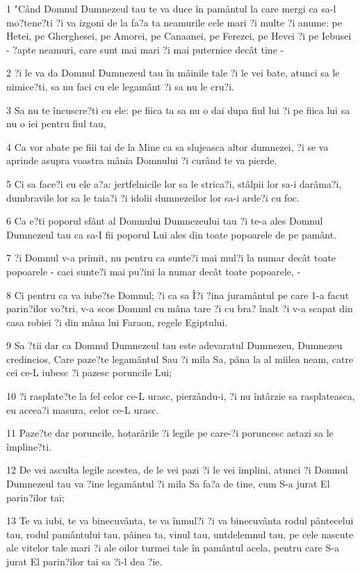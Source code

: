 \par 1 "Când Domnul Dumnezeul tau te va duce în pamântul la care mergi ca sa-l mo?tene?ti ?i va izgoni de la fa?a ta neamurile cele mari ?i multe ?i anume: pe Hetei, pe Gherghesei, pe Amorei, pe Canaanei, pe Ferezei, pe Hevei ?i pe Iebusei - ?apte neamuri, care sunt mai mari ?i mai puternice decât tine -
\par 2 ?i le va da Domnul Dumnezeul tau în mâinile tale ?i le vei bate, atunci sa le nimice?ti, sa nu faci cu ele legamânt ?i sa nu le cru?i.
\par 3 Sa nu te încuscre?ti cu ele: pe fiica ta sa nu o dai dupa fiul lui ?i pe fiica lui sa nu o iei pentru fiul tau,
\par 4 Ca vor abate pe fiii tai de la Mine ca sa slujeasca altor dumnezei, ?i se va aprinde asupra voastra mânia Domnului ?i curând te va pierde.
\par 5 Ci sa face?i cu ele a?a: jertfelnicile lor sa le strica?i, stâlpii lor sa-i darâma?i, dumbravile lor sa le taia?i ?i idolii dumnezeilor lor sa-i arde?i cu foc.
\par 6 Ca e?ti poporul sfânt al Domnului Dumnezeului tau ?i te-a ales Domnul Dumnezeul tau ca sa-I fii poporul Lui ales din toate popoarele de pe pamânt.
\par 7 ?i Domnul v-a primit, nu pentru ca sunte?i mai mul?i la numar decât toate popoarele - caci sunte?i mai pu?ini la numar decât toate popoarele, -
\par 8 Ci pentru ca va iube?te Domnul; ?i ca sa Î?i ?ina juramântul pe care 1-a facut parin?ilor vo?tri, v-a scos Domnul cu mâna tare ?i cu bra? înalt ?i v-a scapat din casa robiei ?i din mâna lui Faraon, regele Egiptului.
\par 9 Sa ?tii dar ca Domnul Dumnezeul tau este adevaratul Dumnezeu, Dumnezeu credincios, Care paze?te legamântul Sau ?i mila Sa, pâna la al miilea neam, catre cei ce-L iubesc ?i pazesc poruncile Lui;
\par 10 ?i rasplate?te la fel celor ce-L urasc, pierzându-i, ?i nu întârzie sa rasplateasca, eu aceea?i masura, celor ce-L urasc.
\par 11 Paze?te dar poruncile, hotarârile ?i legile pe care-?i poruncesc astazi sa le împline?ti.
\par 12 De vei asculta legile acestea, de le vei pazi ?i le vei împlini, atunci ?i Domnul Dumnezeul tau va ?ine legamântul ?i mila Sa fa?a de tine, cum S-a jurat El parin?ilor tai;
\par 13 Te va iubi, te va binecuvânta, te va înmul?i ?i va binecuvânta rodul pântecelui tau, rodul pamântului tau, pâinea ta, vinul tau, untdelemnul tau, pe cele nascute ale vitelor tale mari ?i ale oilor turmei tale în pamântul acela, pentru care S-a jurat El parin?ilor tai sa ?i-l dea ?ie.
